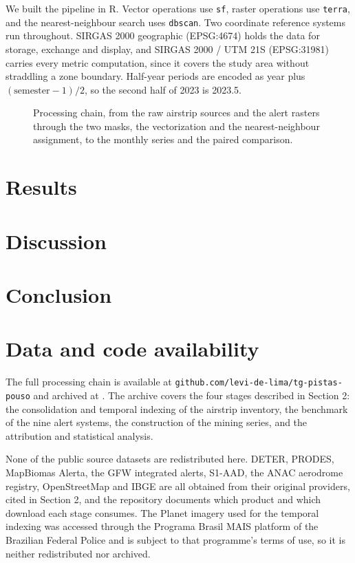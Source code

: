 \documentclass[11pt]{article}
\begin{document}
We built the pipeline in R. Vector operations use \texttt{sf}, raster operations use \texttt{terra}, and the nearest-neighbour search uses \texttt{dbscan}. Two coordinate reference systems run throughout. SIRGAS 2000 geographic (EPSG:4674) holds the data for storage, exchange and display, and SIRGAS 2000 / UTM 21S (EPSG:31981) carries every metric computation, since it covers the study area without straddling a zone boundary. Half-year periods are encoded as year plus $(\text{semester}-1)/2$, so the second half of 2023 is 2023.5.

\begin{figure}[htbp]
\centering
\caption{Processing chain, from the raw airstrip sources and the alert rasters through the two masks, the vectorization and the nearest-neighbour assignment, to the monthly series and the paired comparison.}
\label{fig:workflow}
\end{figure}

\section{Results}


\section{Discussion}


\section{Conclusion}


\section*{Data and code availability}

The full processing chain is available at \texttt{github.com/levi-de-lima/tg-pistas-pouso} and archived at \citet{delima2026code}. The archive covers the four stages described in Section 2: the consolidation and temporal indexing of the airstrip inventory, the benchmark of the nine alert systems, the construction of the mining series, and the attribution and statistical analysis.

None of the public source datasets are redistributed here. DETER, PRODES, MapBiomas Alerta, the GFW integrated alerts, S1-AAD, the ANAC aerodrome registry, OpenStreetMap and IBGE are all obtained from their original providers, cited in Section 2, and the repository documents which product and which download each stage consumes. The Planet imagery used for the temporal indexing was accessed through the Programa Brasil MAIS platform of the Brazilian Federal Police and is subject to that programme's terms of use, so it is neither redistributed nor archived.
\end{document}
